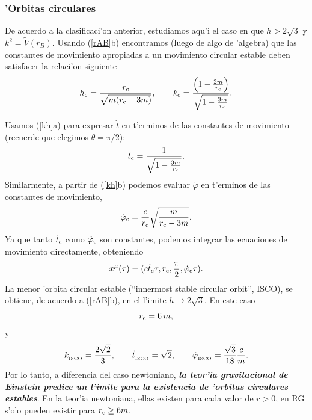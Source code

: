 \subsubsection{'Orbitas circulares}
De acuerdo a la clasificaci'on anterior, estudiamos aqu'i el caso en que $h>2\sqrt{3}$ y $k^2=\tilde{V}(r_B)$. Usando (\ref{rAB}b) encontramos (luego de algo de 'algebra) que las constantes de movimiento apropiadas a un movimiento circular estable deben satisfacer la relaci'on siguiente
\begin{equation}
h_{\rm c}=\frac{r_{\rm c}}{\sqrt{m(r_{\rm c}-3m)}}, \qquad  k_{\rm c}=\frac{\left(1-\frac{2m}{r_{\rm c}}\right)}{\sqrt{1-\frac{3m}{r_{\rm c}}}}.
\end{equation}

Usamos (\ref{kh}a)  para expresar $\dot{t}$ en t'erminos de las constantes de movimiento (recuerde que elegimos $\theta=\pi/2$):
\begin{equation}
 \dot{t}_{\rm c}=\frac{1}{\sqrt{1-\frac{3m}{r_{\rm c}}}}.
\end{equation}
Similarmente, a partir de (\ref{kh}b) podemos evaluar $\dot\varphi$ en t'erminos de las constantes de movimiento,
\begin{equation}
 \dot\varphi_{\rm c}=\frac{c}{r_{\rm c}}\sqrt{\frac{m}{r_{\rm c}-3m}}.
\end{equation}
Ya que tanto $ \dot{t}_{\rm c}$ como $ \dot\varphi_{\rm c}$ son constantes, podemos integrar las ecuaciones de movimiento directamente, obteniendo
\begin{equation}
 x^\mu(\tau)=(c\dot{t}_{\rm c}\tau,r_{\rm c},\frac{\pi}{2}, \dot\varphi_{\rm c}\tau).
\end{equation}
La menor 'orbita circular estable (``innermost stable circular orbit'', ISCO), se obtiene, de acuerdo a (\ref{rAB}b), en el l'imite $h\to 2\sqrt{3}$. En este caso
\begin{equation}
 r_{\rm c}=6\,m,
\end{equation}
y
\begin{equation}
 k_{_{\rm ISCO}}= \frac{2\sqrt{2}}{3}, \qquad \dot{t}_{_{\rm ISCO}}=\sqrt{2}, \qquad \dot\varphi_{_{\rm ISCO}}=\frac{\sqrt{3}}{18}\frac{c}{m}.
\end{equation}
Por lo tanto, a diferencia del caso newtoniano, \textbf{\textit{la teor'ia gravitacional de Einstein predice un l'imite para la existencia de 'orbitas circulares estables}}. En la teor'ia newtoniana, ellas existen para cada valor de $r>0$, en RG s'olo pueden existir para $r_{\rm c}\ge6m$.

